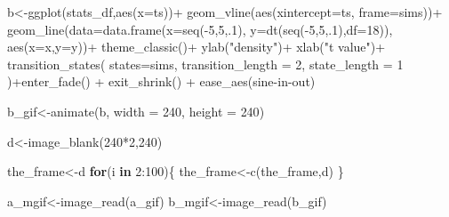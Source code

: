 \documentclass[
  letterpaper,
  DIV=11,
  numbers=noendperiod]{scrreprt}
\newenvironment{Shaded}{\begin{snugshade}}{\end{snugshade}}
\newcommand{\AttributeTok}[1]{\textcolor[rgb]{0.40,0.45,0.13}{#1}}
\newcommand{\ControlFlowTok}[1]{\textcolor[rgb]{0.00,0.23,0.31}{\textbf{#1}}}
\newcommand{\DecValTok}[1]{\textcolor[rgb]{0.68,0.00,0.00}{#1}}
\newcommand{\FunctionTok}[1]{\textcolor[rgb]{0.28,0.35,0.67}{#1}}
\newcommand{\NormalTok}[1]{\textcolor[rgb]{0.00,0.23,0.31}{#1}}
\newcommand{\OtherTok}[1]{\textcolor[rgb]{0.00,0.23,0.31}{#1}}
\newcommand{\SpecialCharTok}[1]{\textcolor[rgb]{0.37,0.37,0.37}{#1}}
\newcommand{\StringTok}[1]{\textcolor[rgb]{0.13,0.47,0.30}{#1}}
\begin{document}
\begin{Shaded}
\begin{Highlighting}[]
\NormalTok{b}\OtherTok{\textless{}{-}}\FunctionTok{ggplot}\NormalTok{(stats\_df,}\FunctionTok{aes}\NormalTok{(}\AttributeTok{x=}\NormalTok{ts))}\SpecialCharTok{+}
  \FunctionTok{geom\_vline}\NormalTok{(}\FunctionTok{aes}\NormalTok{(}\AttributeTok{xintercept=}\NormalTok{ts, }\AttributeTok{frame=}\NormalTok{sims))}\SpecialCharTok{+}
  \FunctionTok{geom\_line}\NormalTok{(}\AttributeTok{data=}\FunctionTok{data.frame}\NormalTok{(}\AttributeTok{x=}\FunctionTok{seq}\NormalTok{(}\SpecialCharTok{{-}}\DecValTok{5}\NormalTok{,}\DecValTok{5}\NormalTok{,.}\DecValTok{1}\NormalTok{),}
                            \AttributeTok{y=}\FunctionTok{dt}\NormalTok{(}\FunctionTok{seq}\NormalTok{(}\SpecialCharTok{{-}}\DecValTok{5}\NormalTok{,}\DecValTok{5}\NormalTok{,.}\DecValTok{1}\NormalTok{),}\AttributeTok{df=}\DecValTok{18}\NormalTok{)),}
            \FunctionTok{aes}\NormalTok{(}\AttributeTok{x=}\NormalTok{x,}\AttributeTok{y=}\NormalTok{y))}\SpecialCharTok{+}
  \FunctionTok{theme\_classic}\NormalTok{()}\SpecialCharTok{+}
  \FunctionTok{ylab}\NormalTok{(}\StringTok{"density"}\NormalTok{)}\SpecialCharTok{+}
  \FunctionTok{xlab}\NormalTok{(}\StringTok{"t value"}\NormalTok{)}\SpecialCharTok{+}
  \FunctionTok{transition\_states}\NormalTok{(}
    \AttributeTok{states=}\NormalTok{sims,}
    \AttributeTok{transition\_length =} \DecValTok{2}\NormalTok{,}
    \AttributeTok{state\_length =} \DecValTok{1}
\NormalTok{  )}\SpecialCharTok{+}\FunctionTok{enter\_fade}\NormalTok{() }\SpecialCharTok{+} 
  \FunctionTok{exit\_shrink}\NormalTok{() }\SpecialCharTok{+}
  \FunctionTok{ease\_aes}\NormalTok{(}\StringTok{\textquotesingle{}sine{-}in{-}out\textquotesingle{}}\NormalTok{)}

\NormalTok{b\_gif}\OtherTok{\textless{}{-}}\FunctionTok{animate}\NormalTok{(b, }\AttributeTok{width =} \DecValTok{240}\NormalTok{, }\AttributeTok{height =} \DecValTok{240}\NormalTok{)}


\NormalTok{d}\OtherTok{\textless{}{-}}\FunctionTok{image\_blank}\NormalTok{(}\DecValTok{240}\SpecialCharTok{*}\DecValTok{2}\NormalTok{,}\DecValTok{240}\NormalTok{)}

\NormalTok{the\_frame}\OtherTok{\textless{}{-}}\NormalTok{d}
\ControlFlowTok{for}\NormalTok{(i }\ControlFlowTok{in} \DecValTok{2}\SpecialCharTok{:}\DecValTok{100}\NormalTok{)\{}
\NormalTok{  the\_frame}\OtherTok{\textless{}{-}}\FunctionTok{c}\NormalTok{(the\_frame,d)}
\NormalTok{\}}

\NormalTok{a\_mgif}\OtherTok{\textless{}{-}}\FunctionTok{image\_read}\NormalTok{(a\_gif)}
\NormalTok{b\_mgif}\OtherTok{\textless{}{-}}\FunctionTok{image\_read}\NormalTok{(b\_gif)}


\end{Highlighting}
\end{Shaded}
\end{document}
